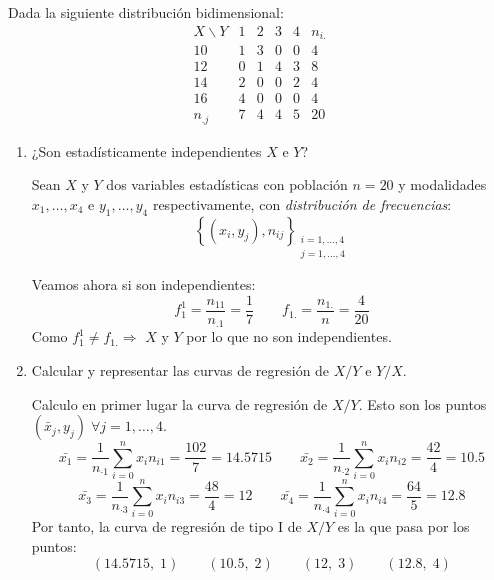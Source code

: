 \begin{ejercicio}
    Dada la siguiente distribución bidimensional:
    \begin{equation*}
        \begin{array}{c|cccc|c}
            X\backslash Y & 1 & 2& 3& 4 & n_{i.}\\ \hline
            10 & 1 & 3 & 0 & 0 & 4\\
            12 & 0 & 1 & 4 & 3 & 8\\
            14 & 2 & 0 & 0 & 2 & 4\\
            16 & 4 & 0 & 0 & 0 & 4\\ \hline
            n_{.j} & 7 & 4 & 4 & 5 & 20
        \end{array}
    \end{equation*}

    \begin{enumerate}
        \item ¿Son estadísticamente independientes $X$ e $Y$?
        
        Sean $X$ y $Y$ dos variables estadísticas con población $n=20$ y modalidades $x_1, \dots, x_4$ e $y_1, \dots, y_4$ respectivamente, con \emph{distribución de frecuencias}:
        $$\left\{ (x_i,y_j), n_{ij}\right\}_{\substack{i=1,\dots,4\\j=1,\dots,4}}$$

        Veamos ahora si son independientes:
        \begin{equation*}
            f_1^1 = \frac{n_{11}}{n_{.1}} = \frac{1}{7} \qquad f_{1.} = \frac{n_{1.}}{n} = \frac{4}{20}
        \end{equation*}
        Como $f_1^1\neq f_{1.} \Longrightarrow $ $X$ y $Y$ por lo que no son independientes.
        
        \item Calcular y representar las curvas de regresión de $X/Y$ e $Y/X$.

        Calculo en primer lugar la curva de regresión de $X/Y$. Esto son los puntos $(\bar{x}_j, y_j)\;\forall j=1,\dots,4$.
        \begin{equation*}
            \bar{x_1} = \frac{1}{n_{\cdot1}}\sum_{i=0}^n x_in_{i1} = \frac{102}{7} = 14.5715
            \qquad
            \bar{x_2} = \frac{1}{n_{\cdot2}}\sum_{i=0}^n x_in_{i2} = \frac{42}{4} = 10.5
        \end{equation*}
        \begin{equation*}
            \bar{x_3} = \frac{1}{n_{\cdot3}}\sum_{i=0}^n x_in_{i3} = \frac{48}{4} = 12
            \qquad
            \bar{x_4} = \frac{1}{n_{\cdot4}}\sum_{i=0}^n x_in_{i4} = \frac{64}{5} = 12.8
        \end{equation*}
        Por tanto, la curva de regresión de tipo I de $X/Y$ es la que pasa por los puntos:
        \begin{equation*}
            (14.5715,\;1)\qquad (10.5,\;2) \qquad (12,\;3) \qquad (12.8,\;4)
        \end{equation*}
        

\end{enumerate}
\end{ejercicio}
